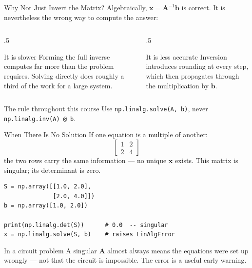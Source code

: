 \documentclass[9pt,aspectratio=169,xcolor=table]{beamer}
\begin{document}
\begin{frame}{Why Not Just Invert the Matrix?}
    \leavevmode
    Algebraically, $\mathbf{x} = \mathbf{A}^{-1}\mathbf{b}$ is correct.
    It is nevertheless the \alert{wrong} way to compute the answer:

    \vspace{2mm}
    \begin{columns}[t]
        \begin{column}{.5\textwidth}
            \begin{block}{It is slower}
                \small Forming the full inverse computes far more than
                the problem requires. Solving directly does roughly a
                third of the work for a large system.
            \end{block}
        \end{column}
        \begin{column}{.5\textwidth}
            \begin{block}{It is less accurate}
                \small Inversion introduces rounding at every step,
                which then propagates through the multiplication by
                $\mathbf{b}$.
            \end{block}
        \end{column}
    \end{columns}

    \vspace{3mm}
    \begin{alertblock}{The rule throughout this course}
        Use \texttt{np.linalg.solve(A, b)}, never
        \texttt{np.linalg.inv(A) @ b}.
    \end{alertblock}
\end{frame}

\begin{frame}[fragile]{When There Is No Solution}
    \leavevmode
    If one equation is a multiple of another:
    \[
    \begin{bmatrix} 1 & 2 \\ 2 & 4 \end{bmatrix}
    \]
    the two rows carry the same information --- no unique $\mathbf{x}$
    exists. This matrix is \alert{singular}; its determinant is zero.

\begin{lstlisting}
S = np.array([[1.0, 2.0],
              [2.0, 4.0]])
b = np.array([1.0, 2.0])

print(np.linalg.det(S))      # 0.0  -- singular
x = np.linalg.solve(S, b)    # raises LinAlgError
\end{lstlisting}

    \begin{block}{In a circuit problem}
        A singular \textbf{A} almost always means the equations were
        set up wrongly --- not that the circuit is impossible. The
        error is a useful early warning.
    \end{block}
\end{frame}
\end{document}
